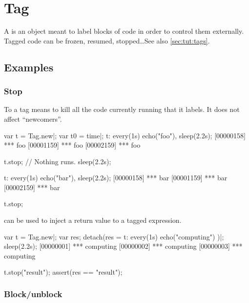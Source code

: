 
\section{Tag}

A  is an object meant to label blocks of code in order to control
them externally.  Tagged code can be frozen, resumed, stopped\ldots See also
\autoref{sec:tut:tags}.

\subsection{Examples}

\subsubsection{Stop}
\label{sec:specs:tag:stop}

To  a tag means to kill all the code currently running that it
labels.  It does not affect ``newcomers''.

\begin{urbiscript}[firstnumber=1]
var t = Tag.new|;
var t0 = time|;
t: every(1s) echo("foo"),
sleep(2.2s);
[00000158] *** foo
[00001159] *** foo
[00002159] *** foo

t.stop;
// Nothing runs.
sleep(2.2s);

t: every(1s) echo("bar"),
sleep(2.2s);
[00000158] *** bar
[00001159] *** bar
[00002159] *** bar

t.stop;
\end{urbiscript}

 can be used to inject a return value to a tagged
expression.

\begin{urbiscript}[firstnumber=1]
var t = Tag.new|;
var res;
detach(res = { t: every(1s) echo("computing") })|;
sleep(2.2s);
[00000001] *** computing
[00000002] *** computing
[00000003] *** computing

t.stop("result");
assert(res == "result");
\end{urbiscript}


\subsubsection{Block/unblock}
\label{sec:specs:tag:block}


